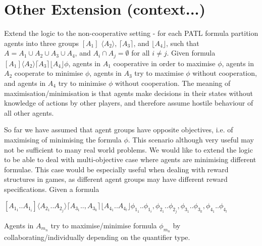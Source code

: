 \documentclass{llncs}
\begin{document}
\section{Other Extension (context...)}

Extend the logic to the non-cooperative setting - for each PATL formula partition agents into three groups $[A_1]$ $\langle A_2 \rangle$, $\lceil A_3\rceil$, and $\lfloor A_4\rfloor$, such that $A = A_1 \cup A_2 \cup A_3 \cup A_4$, and $A_i \cap A_j = \emptyset$ for all $i\neq j$. Given formula $[A_1] \langle A_2 \rangle \lceil A_3\rceil \lfloor A_4 \rfloor \phi$, agents in $A_1$ cooperative in order to maximise $\phi$, agents in $A_2$ cooperate to minimise $\phi$, agents in $A_3$ try to maximise $\phi$ without cooperation, and agents in $A_4$ try to minimise $\phi$ without cooperation. The meaning of maximisation/minimisation  is that agents make decisions in their states without knowledge of actions by other players, and therefore assume hostile behaviour of all other agents. 

So far we have assumed that agent groups have opposite objectives, i.e. of maximising of minimising the formula $\phi$. This scenario although very useful may not be sufficient to many real world problems. We would like to extend the logic to be able to deal with multi-objective case where agents are minimising different formulae. This case would be especially useful when dealing with reward structures in games, as different agent groups may have different reward specifications. Given a formula 


$[A_{1_1}..A_{1_i}] \langle A_{2_1}.. A_{2_j} \rangle \lceil A_{3_1} ..,A_{3_k}\rceil \lfloor A_{4_1} .. A_{4_l} \rfloor \phi_{1_1} .. \phi_{1_i}, \phi_{2_1} .. \phi_{2_j}, \phi_{3_1} ..\phi_{3_k},  \phi_{4_1} .. \phi_{4_l}$

\noindent
Agents in $A_{m_n}$ try to maximise/minimise formula $\phi_{m_n}$ by collaborating/individually depending on the quantifier type.
\end{document}
